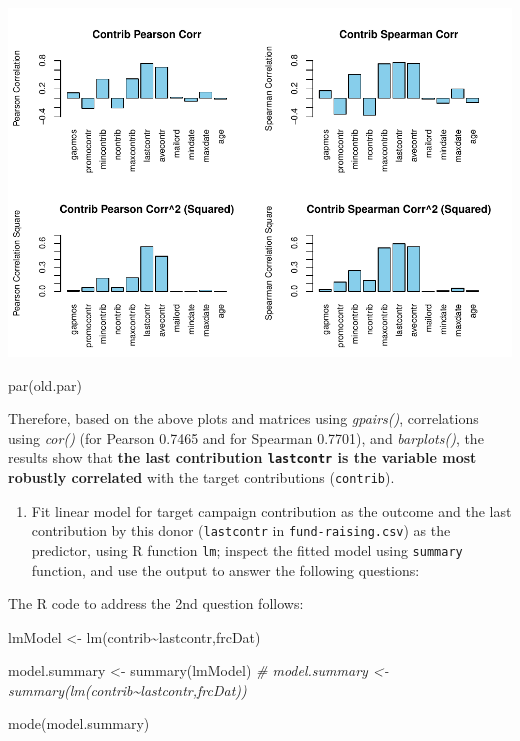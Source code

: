 \documentclass[
]{article}
\newenvironment{Shaded}{\begin{snugshade}}{\end{snugshade}}
\newcommand{\CommentTok}[1]{\textcolor[rgb]{0.56,0.35,0.01}{\textit{#1}}}
\newcommand{\FunctionTok}[1]{\textcolor[rgb]{0.00,0.00,0.00}{#1}}
\newcommand{\NormalTok}[1]{#1}
\newcommand{\OtherTok}[1]{\textcolor[rgb]{0.56,0.35,0.01}{#1}}
\newcommand{\SpecialCharTok}[1]{\textcolor[rgb]{0.00,0.00,0.00}{#1}}
\providecommand{\tightlist}{%
  \setlength{\itemsep}{0pt}\setlength{\parskip}{0pt}}
\begin{document}
\includegraphics{linear_regression__uc_files/figure-latex/Problem1_Q1_barplots-1.pdf}

\begin{Shaded}
\begin{Highlighting}[]
\FunctionTok{par}\NormalTok{(old.par)}
\end{Highlighting}
\end{Shaded}

Therefore, based on the above plots and matrices using \emph{gpairs()},
correlations using \emph{cor()} (for Pearson 0.7465 and for Spearman
0.7701), and \emph{barplots()}, the results show that \textbf{the last
contribution \texttt{lastcontr} is the variable most robustly
correlated} with the target contributions (\texttt{contrib}).

\begin{enumerate}
\def\labelenumi{\arabic{enumi}.}
\setcounter{enumi}{1}
\tightlist
\item
  Fit linear model for target campaign contribution as the outcome and
  the last contribution by this donor (\texttt{lastcontr} in
  \texttt{fund-raising.csv}) as the predictor, using R function
  \texttt{lm}; inspect the fitted model using \texttt{summary} function,
  and use the output to answer the following questions:
\end{enumerate}

The R code to address the 2nd question follows:

\begin{Shaded}
\begin{Highlighting}[]
\NormalTok{lmModel }\OtherTok{\textless{}{-}} \FunctionTok{lm}\NormalTok{(contrib}\SpecialCharTok{\textasciitilde{}}\NormalTok{lastcontr,frcDat)}

\NormalTok{model.summary }\OtherTok{\textless{}{-}} \FunctionTok{summary}\NormalTok{(lmModel)}
\CommentTok{\# model.summary \textless{}{-} summary(lm(contrib\textasciitilde{}lastcontr,frcDat))}

\FunctionTok{mode}\NormalTok{(model.summary)}
\end{Highlighting}
\end{Shaded}
\end{document}

